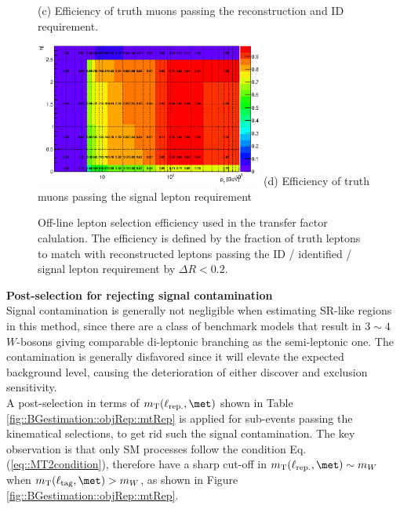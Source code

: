 \begin{figure}
\begin{center}
\begin{minipage}[t]{.49\textwidth}
      \hspace{10mm} (c) Efficiency of truth muons passing the reconstruction and ID requirement.
      \label{fig::BGestimation::objRep::heff_mc_mu_truthToID}
    \end{minipage}
    \begin{minipage}[t]{.49\textwidth}
      \centering
      \includegraphics[width=75mm]{figures/BGestimation/ObjReplacement/method/lepeff/mu_trPtEta_truthToSig.eps}
      \hspace{10mm} (d) Efficiency of truth muons passing the signal lepton requirement
      \label{fig::BGestimation::objRep::heff_mc_mu_truthToSig}
    \end{minipage}
    \caption{Off-line lepton selection efficiency used in the transfer factor calulation.
      The efficiency is defined by the fraction of truth leptons to match with reconstructed leptons passing the ID / identified / signal lepton requirement by $\Delta R<0.2$. 
}
    \label{fig::BGestimation::objRep::lep_efficiency}
  \end{center}
\end{figure}


\noindent \textbf{Post-selection for rejecting signal contamination} \\
Signal contamination is generally not negligible when estimating SR-like regions in this method,
since there are a class of benchmark models that result in $3 \sim 4$ $W$-bosons giving comparable di-leptonic branching as the semi-leptonic one. 
The contamination is generally disfavored since it will elevate the expected background level, causing the deterioration of either discover and exclusion sensitivity. \\

A post-selection in terms of $\mtRep$ shown in Table \ref{fig::BGestimation::objRep::mtRep} is applied for sub-events passing the kinematical selections, to get rid such the signal contamination. 
The key observation is that only SM processes follow the condition Eq. (\ref{eq::MT2condition}), therefore have a sharp cut-off in $\mtRep \sim m_W$ when $\mt(\ell_{\mathrm{tag}},\met)>m_W$, as shown in Figure \ref{fig::BGestimation::objRep::mtRep}. \\

